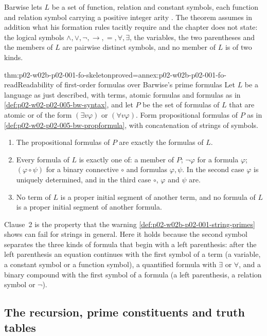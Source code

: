 Barwise lets \(L\) be a set of function, relation and constant symbols,
each function and relation symbol carrying a positive integer arity
\cite[ch.~A.1, \S3, p.~17]{Barwise1977FirstOrder}.  The theorem assumes in
addition what his formation rules tacitly require and the chapter does not
state: the logical symbols \(\land,\lor,\neg,\to,=,\forall,\exists\), the
variables, the two parentheses and the members of \(L\) are pairwise
distinct symbols, and no member of \(L\) is of two kinds.

\begin{hbtheorem}{thm:p02-w02b-p02-001-fo-skeleton}{proved=annex:p02-w02b-p02-001-fo-read}{Readability of first-order formulas over Barwise's prime formulas}
Let \(L\) be a language as just described, with terms, atomic formulas and
formulas as in \cref{def:p02-w02-p02-005-bw-syntax}, and let \(P\) be the
set of formulas of \(L\) that are atomic or of the form \((\exists v\varphi)\)
or \((\forall v\varphi)\).  Form propositional formulas of \(P\) as in
\cref{def:p02-w02-p02-005-bw-propformula}, with concatenation of strings of
symbols.
\begin{enumerate}
\item The propositional formulas of \(P\) are exactly the formulas of \(L\).
\item Every formula of \(L\) is exactly one of: a member of \(P\);
      \(\neg\varphi\) for a formula \(\varphi\); \((\varphi\circ\psi)\) for a
      binary connective \(\circ\) and formulas \(\varphi,\psi\).  In the
      second case \(\varphi\) is uniquely determined, and in the third case
      \(\circ\), \(\varphi\) and \(\psi\) are.
\item No term of \(L\) is a proper initial segment of another term, and no
      formula of \(L\) is a proper initial segment of another formula.
\end{enumerate}
\end{hbtheorem}

Clause~2 is the property that the warning
\cref{def:p02-w02b-p02-001-string-primes} shows can fail for strings in
general.  Here it holds because the second symbol separates the three
kinds of formula that begin with a left parenthesis: after the left
parenthesis an equation continues with the first symbol of a term (a
variable, a constant symbol or a function symbol), a quantified formula
with \(\exists\) or \(\forall\), and a binary compound with the first symbol
of a formula (a left parenthesis, a relation symbol or \(\neg\)).

\subsection{The recursion, prime constituents and truth tables}
\label{sec:p02-w02b-p02-001-recursion}


